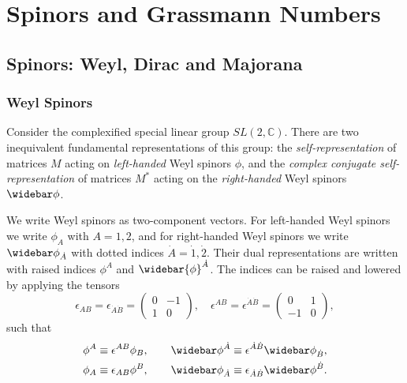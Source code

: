 
\chapter{Spinors and Grassmann Numbers}\label{app:spinor_grassmann}

\section{Spinors: Weyl, Dirac and Majorana}
\subsection*{Weyl Spinors}
Consider the complexified special linear group $SL(2,\mathbb{C})$. There are two inequivalent fundamental representations of this group: the \emph{self-representation} of matrices $M$ acting on \emph{left-handed} Weyl spinors $\phi$, and the \emph{complex conjugate self-representation} of matrices $M^*$ acting on the \emph{right-handed} Weyl spinors $\widebar\phi$.

We write Weyl spinors as two-component vectors. For left-handed Weyl spinors we write $\phi_A$ with $A=1,2$, and for right-handed Weyl spinors we write $\widebar\phi_{\dot{A}}$ with dotted indices $\dot{A}=\dot{1}, \dot{2}$.
Their dual representations are written with raised indices $\phi^A$ and $\widebar{\phi}^{\dot{A}}$.
The indices can be raised and lowered by applying the tensors
\begin{equation}\label{eq:weyl_eps_def}
    \epsilon_{AB}= \epsilon_{\dot{A}\dot{B}}
    = \begin{pmatrix}
        0 & -1 \\ 1 & 0
    \end{pmatrix},
    \quad
    \epsilon^{AB} = \epsilon^{\dot{A}\dot{B}} = \begin{pmatrix}
        0 & 1 \\ -1 & 0
    \end{pmatrix},
\end{equation}
such that
\begin{subequations}
\begin{align}
    \phi^A \equiv \epsilon^{AB}\phi_B, \qquad
    \widebar\phi^{\dot{A}} \equiv \epsilon^{\dot{A}\dot{B}} \widebar\phi_{\dot{B}},
    \\
    \phi_A \equiv \epsilon_{AB}\phi^B, \qquad
    \widebar\phi_{\dot{A}} \equiv \epsilon_{\dot{A}\dot{B}} \widebar\phi^{\dot{B}}.
\end{align}
\end{subequations}

